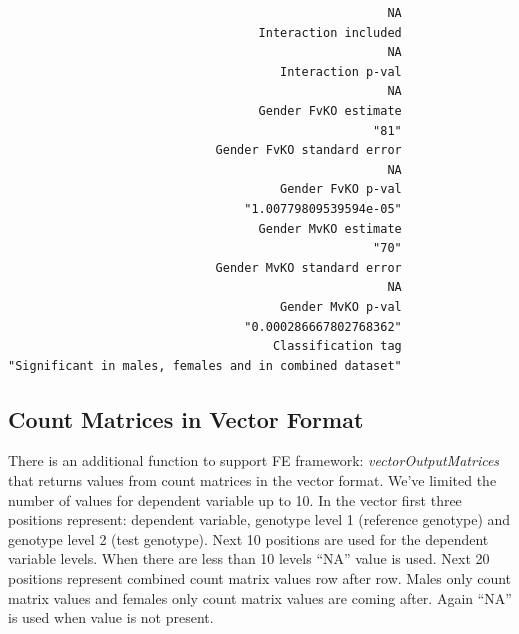 \documentclass[12pt,a4paper]{article}
\begin{document}
\begin{verbatim}
                                                     NA 
                                   Interaction included 
                                                     NA 
                                      Interaction p-val 
                                                     NA 
                                   Gender FvKO estimate 
                                                   "81" 
                             Gender FvKO standard error 
                                                     NA 
                                      Gender FvKO p-val 
                                 "1.00779809539594e-05" 
                                   Gender MvKO estimate 
                                                   "70" 
                             Gender MvKO standard error 
                                                     NA 
                                      Gender MvKO p-val 
                                 "0.000286667802768362" 
                                     Classification tag 
"Significant in males, females and in combined dataset"
\end{verbatim}
\endgroup

\subsection{Count Matrices in Vector Format}
There is an additional function to support FE framework: \textit{vectorOutputMatrices} that returns values from count matrices in the vector format.
We've limited the number of values for dependent variable up to 10. 
In the vector first three positions represent: dependent variable, genotype level 1 (reference genotype) and genotype level 2 (test genotype).
Next 10 positions are used for the dependent variable levels. When there are less than 10 levels ``NA'' value is used.
Next 20 positions represent combined count matrix values row after row. Males only count matrix values and females only count matrix values are coming after. Again ``NA'' is used when value is not present.
\end{document}
